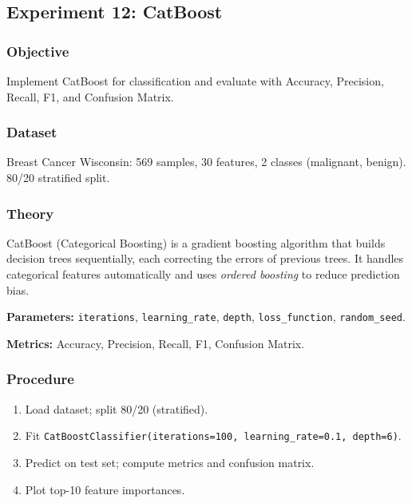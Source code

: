 \documentclass[a4paper,10pt]{article}
\begin{document}
\subsection{Experiment 12: CatBoost}

\subsubsection{Objective}
Implement CatBoost for classification and evaluate with Accuracy, Precision, Recall, F1, and Confusion Matrix.

\subsubsection{Dataset}
Breast Cancer Wisconsin: 569 samples, 30 features, 2 classes (malignant, benign). 80/20 stratified split.

\subsubsection{Theory}
CatBoost (Categorical Boosting) is a gradient boosting algorithm that builds decision trees sequentially, each correcting the errors of previous trees. It handles categorical features automatically and uses \emph{ordered boosting} to reduce prediction bias.

\textbf{Parameters:} \texttt{iterations}, \texttt{learning\_rate}, \texttt{depth}, \texttt{loss\_function}, \texttt{random\_seed}.

\textbf{Metrics:} Accuracy, Precision, Recall, F1, Confusion Matrix.

\subsubsection{Procedure}
\begin{enumerate}[nosep]
    \item Load dataset; split 80/20 (stratified).
    \item Fit \texttt{CatBoostClassifier(iterations=100, learning\_rate=0.1, depth=6)}.
    \item Predict on test set; compute metrics and confusion matrix.
    \item Plot top-10 feature importances.
\end{enumerate}
\end{document}
